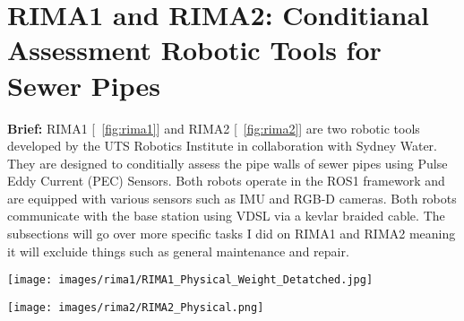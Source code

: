 \section{RIMA1 and RIMA2: Conditianal Assessment Robotic Tools for Sewer Pipes}

\label{sec:industry}

\textbf{Brief: } RIMA1 [~\ref{fig:rima1}] and RIMA2 [~\ref{fig:rima2}] are two robotic tools developed by the UTS Robotics Institute in collaboration with Sydney Water. They are designed to conditially assess the pipe walls of sewer 
pipes using Pulse Eddy Current (PEC) Sensors. Both robots operate in the ROS1 framework and are equipped with various sensors such as IMU and RGB-D cameras. Both robots communicate with the base station using VDSL via a 
kevlar braided cable. The subsections will go over more specific tasks I did on RIMA1 and RIMA2 meaning it will excluide things such as general maintenance and repair.

\begin{figure*}[htbp]
    \centering
    \begin{minipage}[t]{0.48\textwidth}
        \centering
        \texttt{[image: images/rima1/RIMA1\_Physical\_Weight\_Detatched.jpg]}
        \caption{RIMA1}
        \label{fig:rima1}
    \end{minipage}
    \hfill
    \begin{minipage}[t]{0.48\textwidth}
        \centering
        \texttt{[image: images/rima2/RIMA2\_Physical.png]}
        \caption{RIMA2}
        \label{fig:rima2}
    \end{minipage}
\end{figure*}



   